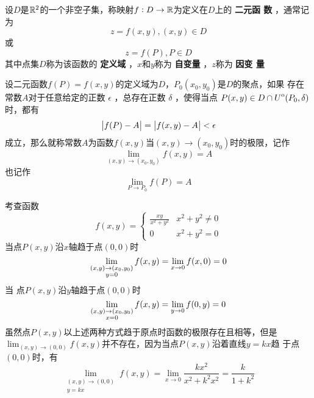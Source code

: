 \documentclass[11pt]{article}
\begin{document}
\begin{definition}[]
设\(D\)是\(\mathbb{R}^2\)的一个非空子集，称映射\(f:D\to\mathbb{R}\)为定义在\(D\)上的 \textbf{二元函
数} ，通常记为
\begin{equation*}
z=f(x,y),(x,y)\in D
\end{equation*}
或
\begin{equation*}
z=f(P),P\in D
\end{equation*}
其中点集\(D\)称为该函数的 \textbf{定义域} ，\(x\)和\(y\)称为 \textbf{自变量} ，\(z\)称为 \textbf{因变
量}
\end{definition}

\begin{definition}[]
设二元函数\(f(P)=f(x,y)\)的定义域为\(D\)，\(P_0(x_0,y_0)\)是\(D\)的聚点，如果
存在常数\(A\)对于任意给定的正数 \(\epsilon\) ，总存在正数 \(\delta\) ，使得当点
\(P(x,y)\in D\cap{\kern0ptU}^{\mathrm{o}}(P_0,\delta)\)时，都有
\begin{equation*}
\abs{f(P)-A}=\abs{f(x,y)-A}<\epsilon
\end{equation*}
成立，那么就称常数\(A\)为函数\(f(x,y)\)当\((x,y)\to(x_0,y_0)\)时的极限，记作
\begin{equation*}
\lim_{(x,y)\to(x_0,y_0)}f(x,y)=A 
\end{equation*}
也记作
\begin{equation*}
\lim_{P\to P_0}f(P)=A
\end{equation*}
\end{definition}

考查函数
\begin{equation*}
f(x,y)=
\begin{cases}
\frac{xy}{x^2+y^2}&x^2+y^2\neq0\\
0&x^2+y^2=0
\end{cases}
\end{equation*}
当点\(P(x,y)\)沿\(x\)轴趋于点\((0,0)\)时
\begin{equation*}
\lim_{\substack{(x,y)\to(x_0,y_0)\\y=0}}f(x,y)=\lim_{x\to0}f(x,0)=0\\
\end{equation*}
当 点\(P(x,y)\)沿\(y\)轴趋于点\((0,0)\)时
\begin{equation*}
\lim_{\substack{(x,y)\to(x_0,y_0)\\x=0}}f(x,y)=\lim_{y\to0}f(0,y)=0\\
\end{equation*}
虽然点\(P(x,y)\)以上述两种方式趋于原点时函数的极限存在且相等，但是
\(\lim_{(x,y)\to(0,0)}f(x,y)\)并不存在，因为当点\(P(x,y)\)沿着直线\(y=kx\)趋
于点\((0,0)\)时，有
\begin{equation*}
\lim_{\substack{(x,y)\to(0,0)\\y=kx}}f(x,y)=
\lim_{x\to0}\frac{kx^2}{x^2+k^2x^2}=\frac{k}{1+k^2}
\end{equation*}
\end{document}
